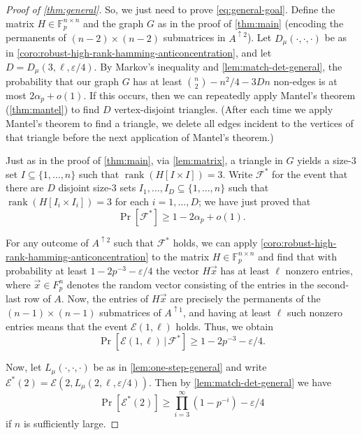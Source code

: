 \documentclass[10pt,reqno]{amsart}
\numberwithin{equation}{section}
\theoremstyle{remark}
\newcommand{\mb}{\mathbb}
\newcommand{\mc}{\mathcal}
\newcommand{\on}{\operatorname}
\newcommand{\eps}{\varepsilon}
\begin{document}
\begin{proof}[Proof of \cref{thm:general}]
So, we just need to prove \cref{eq:general-goal}. Define the matrix $H\in \mb F_p^{n\times n}$ and the graph $G$ as in the proof of \cref{thm:main} (encoding the permanents of $(n-2)\times (n-2)$ submatrices in $A^{\uparrow2}$). Let $D_\mu(\cdot,\cdot,\cdot)$ be as in \cref{coro:robust-high-rank-hamming-anticoncentration}, and let $D=D_\mu(3,\ell,\varepsilon/4)$. By Markov's inequality and \cref{lem:match-det-general}, the probability that our graph $G$ has at least $\binom n 2-n^2/4-3Dn$ non-edges is at most $2\alpha_p+o(1)$. If this occurs, then we can repeatedly apply Mantel's theorem (\cref{thm:mantel}) to find $D$ vertex-disjoint triangles. (After each time we apply Mantel's theorem to find a triangle, we delete all edges incident to the vertices of that triangle before the next application of Mantel's theorem.)

Just as in the proof of \cref{thm:main}, via \cref{lem:matrix}, a triangle in $G$ yields a size-$3$ set $I\subseteq\{1,\dots,n\}$ such that $\on{rank}(H[I\times I])=3$. Write $\mc F^*$ for the event that there are $D$ disjoint size-$3$ sets $I_1,\dots,I_{D}\subseteq\{1,\dots,n\}$ such that $\on{rank}(H[I_i\times I_i])=3$ for each $i=1,\dots,D$; we have just proved that 
\[\Pr[\mc F^*]\ge 1-2\alpha_p+o(1).\]

For any outcome of $A^{\uparrow2}$ such that $\mc F^*$ holds, we can apply \cref{coro:robust-high-rank-hamming-anticoncentration}  to the matrix $H\in \mb F_p^{n\times n}$ and find that  with probability at least $1-2p^{-3}-\eps/4$ the vector $H\vec{x}$ has at least $\ell$ nonzero entries, where $\vec{x}\in F_p^{n}$ denotes the random vector consisting of the entries in the second-last row of $A$. Now, the entries of $H\vec{x}$ are precisely the permanents of the $(n-1)\times (n-1)$ submatrices of $A^{\uparrow1}$, and having at least $\ell$ such nonzero entries means that the event $\mc E(1,\ell)$ holds. Thus, we obtain
\[\Pr[\mc E(1,\ell)\,|\,\mc F^*]\ge 1-2p^{-3}-\eps/4.\]

Now, let $L_\mu(\cdot,\cdot,\cdot)$ be as in \cref{lem:one-step-general} and write $\mc E^*(2)=\mc E(2,L_\mu(2,\ell,\varepsilon/4))$. Then by \cref{lem:match-det-general} we have
\[\Pr[\mc E^*(2)]\ge \prod_{i=3}^\infty(1-p^{-i})-\varepsilon/4\]
if $n$ is sufficiently large.


\end{proof}
\end{document}
